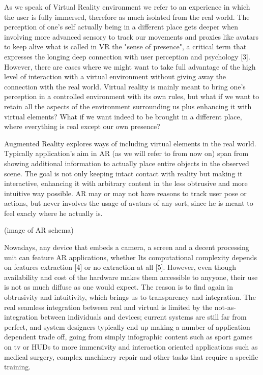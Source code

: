 As we speak of Virtual Reality environment we refer to an experience in which the user is fully immersed, therefore as much isolated from the real world. The perception of one’s self actually being in a different place gets deeper when involving more advanced sensory to track our movements and proxies like avatars to keep alive what is called in VR the "sense of presence", a critical term that expresses the longing deep connection with user perception and psychology [3]. However, there are cases where we might want to take full advantage of the high level of interaction with a virtual environment without giving away the connection with the real world. Virtual reality is mainly meant to bring one’s perception in a controlled environment with its own rules, but what if we want to retain all the aspects of the environment surrounding us plus enhancing it with virtual elements? What if we want indeed to be brought in a different place, where everything is real except our own presence?

Augmented Reality explores ways of including virtual elements in the real world. Typically application’s aim in AR (as we will refer to from now on) span from showing additional information to actually place entire objects in the observed scene. The goal is not only keeping intact contact with reality but making it interactive, enhancing it with arbitrary content in the less obtrusive and more intuitive way possible. AR may or may not have reasons to track user pose or actions, but never involves the usage of avatars of any sort, since he is meant to feel exacly where he actually is.

(image of AR schema)

Nowadays, any device that embeds a camera, a screen and a decent processing unit can feature AR applications, whether Its computational complexity depends on features extraction [4] or no extraction at all [5]. However, even though availability and cost of the hardware makes them accessible to anyyone, their use is not as much diffuse as one would expect. The reason is to find again in obtrusivity and intuitivity, which brings us to transparency and integration. The real seamless integration between real and virtual is limited by the not-as-integration between individuals and devices; current systems are still far from perfect, and system designers typically end up making a number of application dependent trade off, going from simply infographic content such as sport games on tv or HUDs to more immersivity and interaction oriented applications such as medical surgery, complex machinery repair and other tasks that require a specific training.


